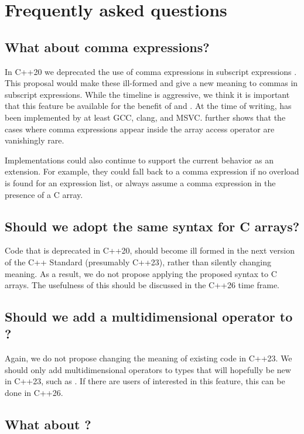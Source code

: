 \documentclass{wg21}
\begin{document}
\section{Frequently asked questions}

\subsection{What about comma expressions?}

In C++20 we deprecated the use of comma expressions in subscript expressions .
This proposal would make these ill-formed and give a new meaning to commas in subscript expressions.
While the timeline is aggressive, we think it is important that this feature be available for the benefit of  and .
At the time of writing,  has been implemented by at least GCC, clang, and MSVC.
 further shows that the cases where comma expressions appear inside the array access operator are vanishingly rare.

Implementations could also continue to support the current behavior as an extension.  For example, they could fall back to a comma expression if no overload is found for an expression list, or always assume a comma expression in the presence of a C array.

\subsection{Should we adopt the same syntax for C arrays?}

Code that is deprecated in C++20, should become ill formed in the next version of the C++ Standard (presumably C++23),
rather than silently changing meaning.
As a result, we do not propose applying the proposed syntax to C arrays.
The usefulness of this should be discussed in the C++26 time frame.

\subsection{Should we add a multidimensional operator to ?}

Again, we do not propose changing the meaning of existing code in C++23.
We should only add multidimensional operators to types that will hopefully be new in C++23, such as .
If there are users of  interested in this feature, this can be done in C++26.

\subsection{What about \tcode{[foo][bar]}?}
\end{document}
